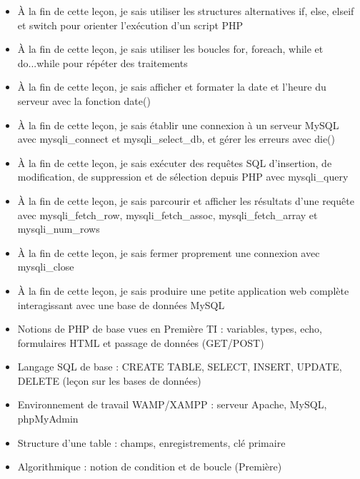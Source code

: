 \documentclass[11pt]{article}
\begin{document}
\begin{objectifs}
\begin{itemize}
\item À la fin de cette leçon, je sais utiliser les structures alternatives if, else, elseif et switch pour orienter l'exécution d'un script PHP
\item À la fin de cette leçon, je sais utiliser les boucles for, foreach, while et do...while pour répéter des traitements
\item À la fin de cette leçon, je sais afficher et formater la date et l'heure du serveur avec la fonction date()
\item À la fin de cette leçon, je sais établir une connexion à un serveur MySQL avec mysqli\_connect et mysqli\_select\_db, et gérer les erreurs avec die()
\item À la fin de cette leçon, je sais exécuter des requêtes SQL d'insertion, de modification, de suppression et de sélection depuis PHP avec mysqli\_query
\item À la fin de cette leçon, je sais parcourir et afficher les résultats d'une requête avec mysqli\_fetch\_row, mysqli\_fetch\_assoc, mysqli\_fetch\_array et mysqli\_num\_rows
\item À la fin de cette leçon, je sais fermer proprement une connexion avec mysqli\_close
\item À la fin de cette leçon, je sais produire une petite application web complète interagissant avec une base de données MySQL
\end{itemize}
\end{objectifs}

\begin{prerequis}
\begin{itemize}
\item Notions de PHP de base vues en Première TI : variables, types, echo, formulaires HTML et passage de données (GET/POST)
\item Langage SQL de base : CREATE TABLE, SELECT, INSERT, UPDATE, DELETE (leçon sur les bases de données)
\item Environnement de travail WAMP/XAMPP : serveur Apache, MySQL, phpMyAdmin
\item Structure d'une table : champs, enregistrements, clé primaire
\item Algorithmique : notion de condition et de boucle (Première)
\end{itemize}
\end{prerequis}

\newpage
\end{document}

